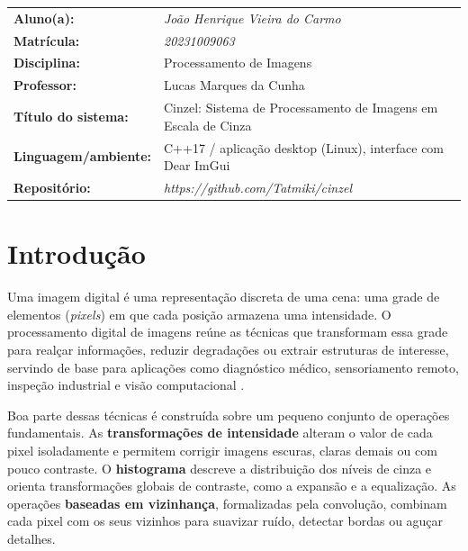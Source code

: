 \documentclass[11pt,a4paper]{article}
\newcommand{\placeholder}[1]{\textcolor{muted}{\textit{#1}}}
\begin{document}
\begin{campo}
\begin{tabularx}{\textwidth}{>{\bfseries}p{37mm}X}
Aluno(a): & \placeholder{João Henrique Vieira do Carmo}\\[2mm]
Matrícula: & \placeholder{20231009063}\\[2mm]
Disciplina: & Processamento de Imagens\\[2mm]
Professor: & Lucas Marques da Cunha\\[2mm]
Título do sistema: & Cinzel: Sistema de Processamento de Imagens em Escala de Cinza\\[2mm]
Linguagem/ambiente: & C++17 / aplicação desktop (Linux), interface com Dear ImGui\\[2mm]
Repositório: & \placeholder{https://github.com/Tatmiki/cinzel}\\
\end{tabularx}
\end{campo}

\vspace{3mm}
\tableofcontents
\newpage

\section{Introdução}

Uma imagem digital é uma representação discreta de uma cena: uma grade de elementos
(\textit{pixels}) em que cada posição armazena uma intensidade. O processamento digital de
imagens reúne as técnicas que transformam essa grade para realçar informações, reduzir
degradações ou extrair estruturas de interesse, servindo de base para aplicações como
diagnóstico médico, sensoriamento remoto, inspeção industrial e visão computacional
\cite{gonzalez}.

Boa parte dessas técnicas é construída sobre um pequeno conjunto de operações fundamentais.
As \textbf{transformações de intensidade} alteram o valor de cada pixel isoladamente e
permitem corrigir imagens escuras, claras demais ou com pouco contraste. O \textbf{histograma}
descreve a distribuição dos níveis de cinza e orienta transformações globais de contraste,
como a expansão e a equalização. As operações \textbf{baseadas em vizinhança}, formalizadas
pela convolução, combinam cada pixel com os seus vizinhos para suavizar ruído, detectar
bordas ou aguçar detalhes.
\end{document}
